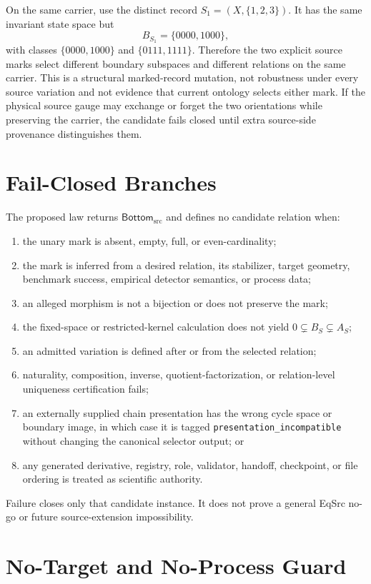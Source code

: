 \documentclass[11pt]{article}
\newcommand{\Bottom}{\mathsf{Bottom}_{\mathrm{src}}}
\begin{document}
On the same carrier, use the distinct record
\(S_1=(X,\{1,2,3\})\). It has the same invariant state space but
\[
 B_{S_1}=\{0000,1000\},
\]
with classes \(\{0000,1000\}\) and \(\{0111,1111\}\). Therefore the two
explicit source marks select different boundary subspaces and different
relations on the same carrier. This is a structural marked-record mutation,
not robustness under every source variation and not evidence that current
ontology selects either mark. If the physical source gauge may exchange or
forget the two orientations while preserving the carrier, the candidate
fails closed until extra source-side provenance distinguishes them.

\section{Fail-Closed Branches}

The proposed law returns \(\Bottom\) and defines no candidate relation when:
\begin{enumerate}[leftmargin=*]
  \item the unary mark is absent, empty, full, or even-cardinality;
  \item the mark is inferred from a desired relation, its stabilizer, target
  geometry, benchmark success, empirical detector semantics, or process data;
  \item an alleged morphism is not a bijection or does not preserve the mark;
  \item the fixed-space or restricted-kernel calculation does not yield
  \(0\subsetneq B_S\subsetneq A_S\);
  \item an admitted variation is defined after or from the selected relation;
  \item naturality, composition, inverse, quotient-factorization, or
  relation-level uniqueness certification fails;
  \item an externally supplied chain presentation has the wrong cycle space
  or boundary image, in which case it is tagged
  \texttt{presentation\_incompatible} without changing the canonical
  selector output; or
  \item any generated derivative, registry, role, validator, handoff,
  checkpoint, or file ordering is treated as scientific authority.
\end{enumerate}
Failure closes only that candidate instance. It does not prove a general
EqSrc no-go or future source-extension impossibility.

\section{No-Target and No-Process Guard}
\end{document}
